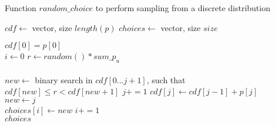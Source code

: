 \begin{algorithm}
	\caption{Function $random\_choice$ to perform sampling from a discrete distribution}
	\label{algo:ba_r_c}
	\begin{algorithmic}[1]
		\State $cdf \gets $ vector, size $length(p)$
		\State $choices \gets $ vector, size $size$
		
		\State  $cdf[0]=p[0]$
		\\
		\State $i \gets 0$
		 
		\State $r \gets random()*sum\_p_u$ 
		\\
		\\
		\State $new \gets $ binary search in $cdf[0...j+1]$, such that $cdf[new]\leq r < cdf[new+1]$
		\Else
		 
		\State $j+=1$
		\State $cdf[j]\gets cdf[j-1] + p[j]$
		\EndWhile
		\\
		\State $new \gets j$ 
		\EndIf
		\\
		\State $choices[i] \gets new$
		\State $i+=1$
		\EndIf
		\EndWhile
		\\
		\State \Return $choices$
		\EndFunction
	\end{algorithmic}
	
\end{algorithm}


